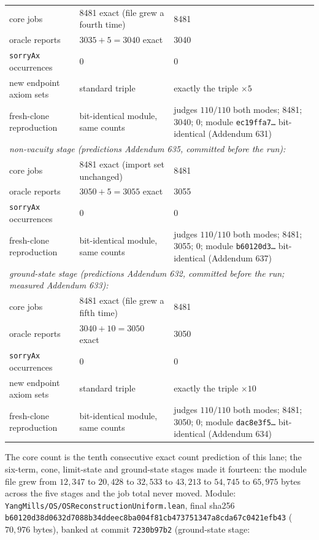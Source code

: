 \documentclass[11pt]{article}
\newcommand{\lean}[1]{\texttt{#1}}
\begin{document}
\begin{center}
\begin{tabular}{lll}
core jobs & 8481 exact (file grew a fourth time) & 8481 \\
oracle reports & $3035+5 = 3040$ exact & 3040 \\
\lean{sorryAx} occurrences & 0 & 0 \\
new endpoint axiom sets & standard triple & exactly the triple
$\times 5$ \\
fresh-clone reproduction & bit-identical module, same counts &
judges $110/110$ both modes; 8481; 3040; 0; module
\lean{ec19ffa7\ldots} bit-identical (Addendum 631) \\
\hline
\multicolumn{3}{l}{\emph{non-vacuity stage (predictions Addendum 635,
committed before the run):}} \\
core jobs & 8481 exact (import set unchanged) & 8481 \\
oracle reports & $3050+5 = 3055$ exact & 3055 \\
\lean{sorryAx} occurrences & 0 & 0 \\
fresh-clone reproduction & bit-identical module, same counts &
judges $110/110$ both modes; 8481; 3055; 0; module
\lean{b60120d3\ldots} bit-identical (Addendum 637) \\
\hline
\multicolumn{3}{l}{\emph{ground-state stage (predictions Addendum 632,
committed before the run; measured Addendum 633):}} \\
core jobs & 8481 exact (file grew a fifth time) & 8481 \\
oracle reports & $3040+10 = 3050$ exact & 3050 \\
\lean{sorryAx} occurrences & 0 & 0 \\
new endpoint axiom sets & standard triple & exactly the triple
$\times 10$ \\
fresh-clone reproduction & bit-identical module, same counts &
judges $110/110$ both modes; 8481; 3050; 0; module
\lean{dac8e3f5\ldots} bit-identical (Addendum 634) \\
\end{tabular}
\end{center}
The core count is the tenth consecutive exact count prediction of this
lane; the six-term, cone, limit-state and ground-state stages made it
fourteen: the module file grew from
$12{,}347$ to $20{,}428$ to $32{,}533$ to $43{,}213$ to $54{,}745$ to
$65{,}975$ bytes across the five stages and the job total never
moved.
Module: \lean{YangMills/OS/OSReconstructionUniform.lean}, final sha256
\lean{b60120d38d0632d7088b34ddeec8ba004f81cb473751347a8cda67c0421efb43}
($70{,}976$ bytes), banked at commit \lean{7230b97b2} (ground-state stage:
\end{document}
